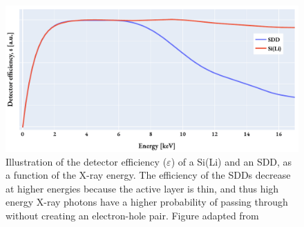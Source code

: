 \begin{figure}[pht]
    \centering
    \includegraphics[width=0.8\linewidth]{figures/detector_efficiency_illustration.pdf}
    \caption{
        Illustration of the detector efficiency ($\varepsilon$) of a Si(Li) and an SDD, as a function of the X-ray energy.
        The efficiency of the SDDs decrease at higher energies because the active layer is thin, and thus high energy X-ray photons have a higher probability of passing through without creating an electron-hole pair.
        Figure adapted from \cite[Fig. 4655c]{liao2006practical}
    }
    \label{fig:detector_efficiency}
\end{figure}




